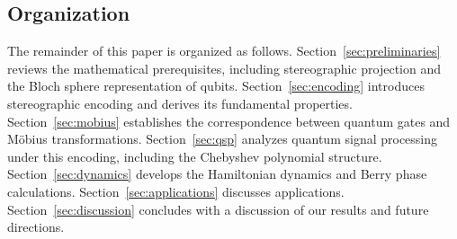 \subsection{Organization}

The remainder of this paper is organized as follows. Section~\ref{sec:preliminaries} reviews the mathematical prerequisites, including stereographic projection and the Bloch sphere representation of qubits. Section~\ref{sec:encoding} introduces stereographic encoding and derives its fundamental properties. Section~\ref{sec:mobius} establishes the correspondence between quantum gates and Möbius transformations. Section~\ref{sec:qsp} analyzes quantum signal processing under this encoding, including the Chebyshev polynomial structure. Section~\ref{sec:dynamics} develops the Hamiltonian dynamics and Berry phase calculations. Section~\ref{sec:applications} discusses applications. Section~\ref{sec:discussion} concludes with a discussion of our results and future directions.
